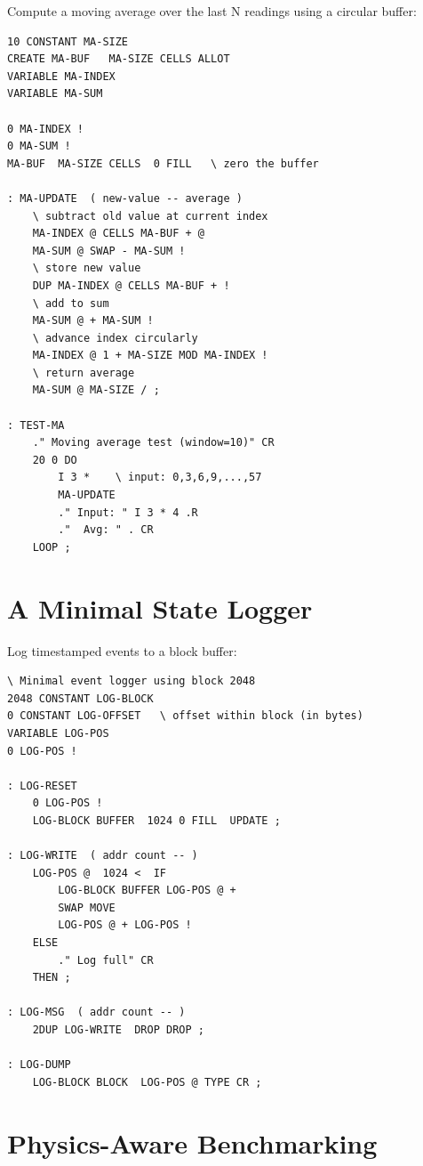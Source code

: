 Compute a moving average over the last N readings using a circular buffer:

\begin{lstlisting}[language=Forth]
10 CONSTANT MA-SIZE
CREATE MA-BUF   MA-SIZE CELLS ALLOT
VARIABLE MA-INDEX
VARIABLE MA-SUM

0 MA-INDEX !
0 MA-SUM !
MA-BUF  MA-SIZE CELLS  0 FILL   \ zero the buffer

: MA-UPDATE  ( new-value -- average )
    \ subtract old value at current index
    MA-INDEX @ CELLS MA-BUF + @
    MA-SUM @ SWAP - MA-SUM !
    \ store new value
    DUP MA-INDEX @ CELLS MA-BUF + !
    \ add to sum
    MA-SUM @ + MA-SUM !
    \ advance index circularly
    MA-INDEX @ 1 + MA-SIZE MOD MA-INDEX !
    \ return average
    MA-SUM @ MA-SIZE / ;

: TEST-MA
    ." Moving average test (window=10)" CR
    20 0 DO
        I 3 *    \ input: 0,3,6,9,...,57
        MA-UPDATE
        ." Input: " I 3 * 4 .R
        ."  Avg: " . CR
    LOOP ;
\end{lstlisting}

\section{A Minimal State Logger}
\label{sec:example-logger}

Log timestamped events to a block buffer:

\begin{lstlisting}[language=Forth]
\ Minimal event logger using block 2048
2048 CONSTANT LOG-BLOCK
0 CONSTANT LOG-OFFSET   \ offset within block (in bytes)
VARIABLE LOG-POS
0 LOG-POS !

: LOG-RESET
    0 LOG-POS !
    LOG-BLOCK BUFFER  1024 0 FILL  UPDATE ;

: LOG-WRITE  ( addr count -- )
    LOG-POS @  1024 <  IF
        LOG-BLOCK BUFFER LOG-POS @ +
        SWAP MOVE
        LOG-POS @ + LOG-POS !
    ELSE
        ." Log full" CR
    THEN ;

: LOG-MSG  ( addr count -- )
    2DUP LOG-WRITE  DROP DROP ;

: LOG-DUMP
    LOG-BLOCK BLOCK  LOG-POS @ TYPE CR ;
\end{lstlisting}

\section{Physics-Aware Benchmarking}
\label{sec:example-physics-bench}


